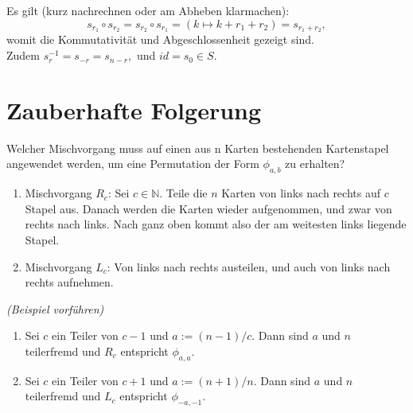 \documentclass[a4paper]{article}
\begin{document}
    \begin{beweis}
        Es gilt (kurz nachrechnen oder am Abheben klarmachen):  
       \[
           s_{r_1} \circ s_{r_2} = s_{r_2} \circ s_{r_1} = (k \mapsto k + r_1 + r_2) = s_{r_1 + r_2}
       ,\] 
       womit die Kommutativität und Abgeschlossenheit gezeigt sind. \\
       Zudem $s_{r}^{-1} = s_{-r} = s_{n-r},$ und $id = s_0 \in S$.
    \end{beweis}

    \section{Zauberhafte Folgerung}
    Welcher Mischvorgang muss auf einen aus n Karten bestehenden Kartenstapel angewendet werden, um eine Permutation der Form $\phi_{a,b}$ zu erhalten? 
    \begin{enumerate}
    \item Mischvorgang $R_c$: Sei $c \in \mathbb{N}$. Teile die $n$ Karten von links nach rechts auf $c$ Stapel aus. Danach werden die Karten wieder aufgenommen, und zwar von rechts nach links. Nach ganz oben kommt also der am weitesten links liegende Stapel.
    \item Mischvorgang $L_c$: Von links nach rechts austeilen, und auch von links nach rechts aufnehmen.
    \end{enumerate}
    \textit{(Beispiel vorführen)}
    \begin{definition} 
    \begin{enumerate}
    \item Sei $c$ ein Teiler von $c - 1$ und $a := (n - 1)/c$. Dann sind $a$ und $n$ teilerfremd und $R_c$ entspricht $\phi_{a,a}$.
    \item Sei $c$ ein Teiler von $c + 1$ und $a := (n + 1)/n$. Dann sind $a$ und $n$ teilerfremd und $L_c$ entspricht $\phi_{-a,-1}$.
    \end{enumerate}
    \end{definition}
    \vspace{2mm}
\end{document}
